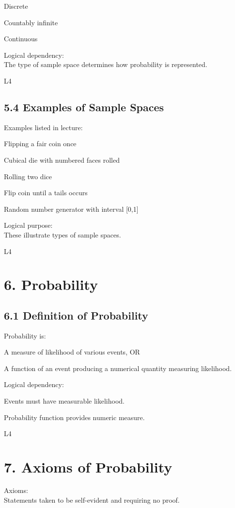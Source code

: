 \documentclass[12pt]{article}
\begin{document}
Discrete

Countably infinite

Continuous

Logical dependency: \\
The type of sample space determines how probability is represented. 

L4

\subsection*{5.4 Examples of Sample Spaces}

Examples listed in lecture:

Flipping a fair coin once

Cubical die with numbered faces rolled

Rolling two dice

Flip coin until a tails occurs

Random number generator with interval [0,1]

Logical purpose: \\
These illustrate types of sample spaces. 

L4

\section*{6. Probability}

\subsection*{6.1 Definition of Probability}

Probability is:

A measure of likelihood of various events, OR

A function of an event producing a numerical quantity measuring likelihood.

Logical dependency:

Events must have measurable likelihood.

Probability function provides numeric measure. 

L4

\section*{7. Axioms of Probability}

Axioms: \\
Statements taken to be self-evident and requiring no proof.
\end{document}
